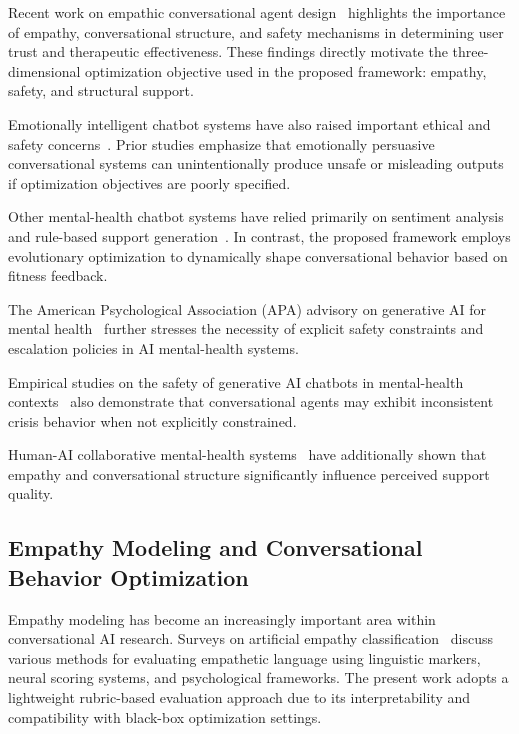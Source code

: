 \documentclass[mathematics,article,xetex,moreauthors]{Definitions/mdpi}
\begin{document}
Recent work on empathic conversational agent design~\cite{jmir2024_empathic}
highlights the importance of empathy, conversational structure, and safety
mechanisms in determining user trust and therapeutic effectiveness. These
findings directly motivate the three-dimensional optimization objective used in
the proposed framework: empathy, safety, and structural support.

Emotionally intelligent chatbot systems have also raised important ethical and
safety concerns~\cite{ijca2025emotion}. Prior studies emphasize that emotionally
persuasive conversational systems can unintentionally produce unsafe or
misleading outputs if optimization objectives are poorly specified.

Other mental-health chatbot systems have relied primarily on sentiment analysis
and rule-based support generation~\cite{scitepress2025chatbot}. In contrast, the
proposed framework employs evolutionary optimization to dynamically shape
conversational behavior based on fitness feedback.

The American Psychological Association (APA) advisory on generative AI for
mental health~\cite{apa2024_advisory} further stresses the necessity of explicit
safety constraints and escalation policies in AI mental-health systems.

Empirical studies on the safety of generative AI chatbots in mental-health
contexts~\cite{harvard2024_safety} also demonstrate that conversational agents
may exhibit inconsistent crisis behavior when not explicitly constrained.

Human-AI collaborative mental-health systems~\cite{humanai2024} have
additionally shown that empathy and conversational structure significantly
influence perceived support quality.

\subsection{Empathy Modeling and Conversational Behavior Optimization}

Empathy modeling has become an increasingly important area within conversational
AI research. Surveys on artificial empathy
classification~\cite{empathysurvey2025} discuss various methods for evaluating
empathetic language using linguistic markers, neural scoring systems, and
psychological frameworks. The present work adopts a lightweight rubric-based
evaluation approach due to its interpretability and compatibility with black-box
optimization settings.
\end{document}
